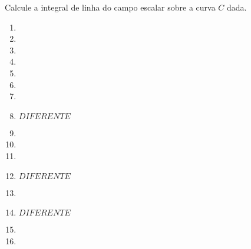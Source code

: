 



	
	
	\vspace{5mm}
	
	Calcule a integral de linha do campo escalar sobre a curva $C$ dada.
	
	\begin{enumerate}
		
		\item
		\resposta{}

		\item
		\resposta{}

		\item
		\resposta{}

		\item
		\resposta{}

		\item
		\resposta{}

		\item
		\resposta{}

		\item
		\resposta{}

		\item $DIFERENTE$

		\item
		\resposta{}

		\item
		\resposta{}

		\item
		\resposta{}

		\item $DIFERENTE$

		\item
		\resposta{}

		\item $DIFERENTE$

		\item
		\resposta{}

		\item
		\resposta{}
	
	\end{enumerate}
	
	\vspace{5mm}
	
